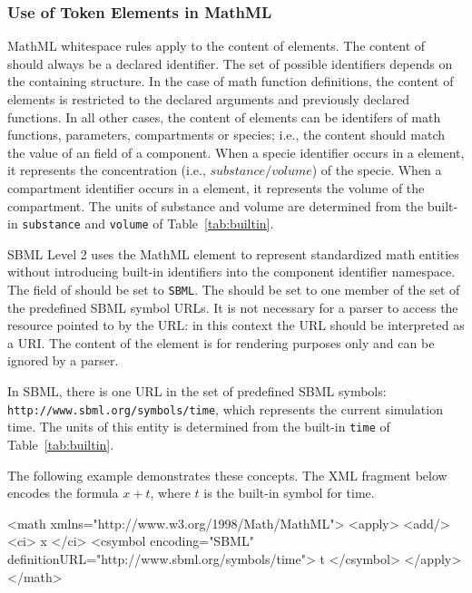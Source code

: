 \documentclass[10pt,twocolumntoc]{cekarticle}
\newcommand{\vref}[1]{\ref{#1}}
\begin{document}
\subsubsection{Use of Token Elements in MathML}
\label{sec:mathmltokens}

MathML whitespace rules apply to the content of  elements. The
content of  should always be a declared identifier.  The set of
possible identifiers depends on the containing structure.  In the case of
math function definitions, the content of  elements is restricted
to the declared arguments and previously declared functions.  In all other
cases, the content of  elements can be identifers of math
functions, parameters, compartments or species; i.e., the content should
match the value of an  field of a component.  When a specie
identifier occurs in a  element, it represents the concentration
(i.e., $substance/volume$) of the specie.  When a compartment identifier
occurs in a  element, it represents the volume of the
compartment. The units of substance and volume are determined from the
built-in \texttt{substance} and \texttt{volume} of
Table~\vref{tab:builtin}.

SBML Level 2 uses the MathML  element to represent
standardized math entities without introducing built-in identifiers into
the component identifier namespace.  The  field of
 should be set to \texttt{SBML}.  The 
should be set to one member of the set of the predefined SBML symbol URLs.
It is not necessary for a parser to access the resource pointed to by the
URL: in this context the URL should be interpreted as a URI.  The content
of the  element is for rendering purposes only and can be
ignored by a parser.

In SBML, there is one URL in the set of predefined SBML symbols:
\texttt{http://www.sbml.org/symbols/time}, which represents the current
simulation time.  The units of this entity is determined from the built-in
\texttt{time} of Table~\vref{tab:builtin}.

The following example demonstrates these concepts.  The XML fragment below
encodes the formula $x + t$, where $t$ is the built-in symbol for time.

\begin{example}
<math xmlns="http://www.w3.org/1998/Math/MathML">
    <apply>
        <add/>
        <ci> x </ci>
        <csymbol encoding="SBML" definitionURL="http://www.sbml.org/symbols/time">
            t
        </csymbol>
    </apply>
</math>
\end{example}
\end{document}
